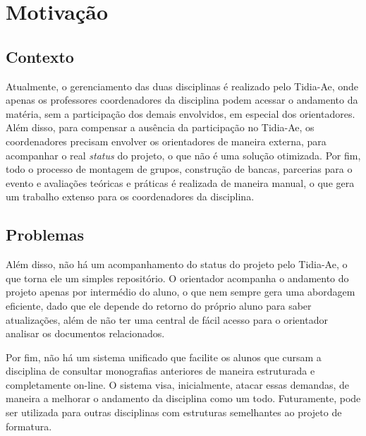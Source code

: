 \chapter{Motivação}

\section{Contexto}
Atualmente, o gerenciamento das duas disciplinas é realizado pelo Tidia-Ae, onde apenas os professores coordenadores da disciplina podem acessar o andamento da matéria, sem a participação dos demais envolvidos, em especial dos orientadores. Além disso, para compensar a ausência da participação no Tidia-Ae, os coordenadores precisam envolver os orientadores de maneira externa, para acompanhar o real \textit{status} do projeto, o que não é uma solução otimizada. Por fim, todo o processo de montagem de grupos, construção de bancas, parcerias para o evento e avaliações teóricas e práticas é realizada de maneira manual, o que gera um trabalho extenso para os coordenadores da disciplina.


\section{Problemas}
Além disso, não há um acompanhamento do status do projeto pelo Tidia-Ae, o que torna ele um simples repositório. O orientador acompanha o andamento do projeto apenas por intermédio do aluno, o que nem sempre gera uma abordagem eficiente, dado que ele depende do retorno do próprio aluno para saber atualizações, além de não ter uma central de fácil acesso para o orientador analisar os documentos relacionados.

Por fim, não há um sistema unificado que facilite os alunos que cursam a disciplina de consultar monografias anteriores de maneira estruturada e completamente on-line. O sistema visa, inicialmente, atacar essas demandas, de maneira a melhorar o andamento da disciplina como um todo. Futuramente, pode ser utilizada para outras disciplinas com estruturas semelhantes ao projeto de formatura.
